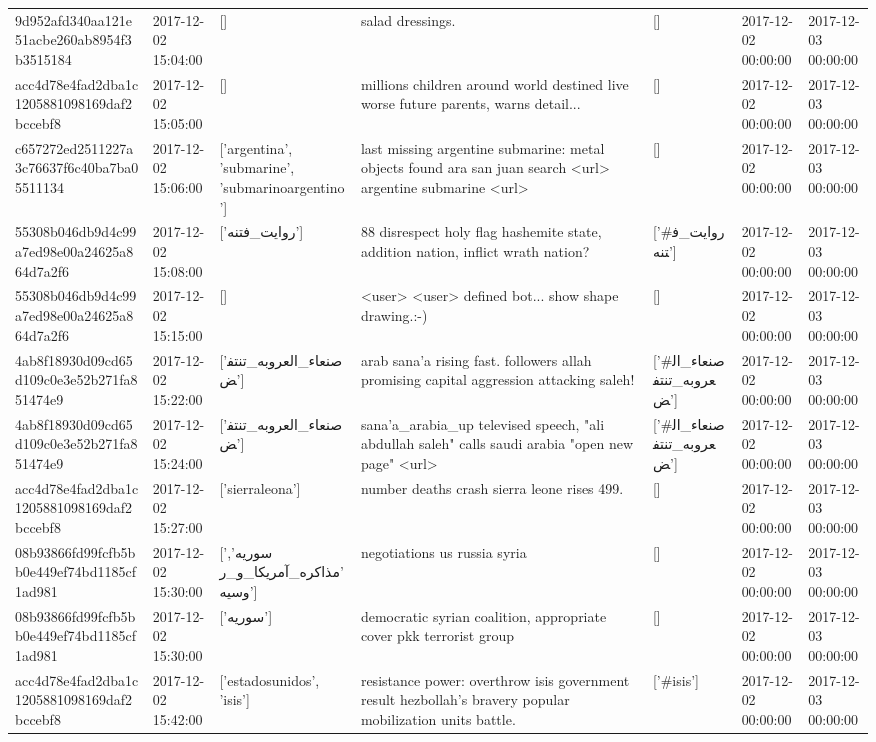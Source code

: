 \begin{tabular}{lllllll}
9d952afd340aa121e51acbe260ab8954f3b3515184 & 2017-12-02 15:04:00 & [] & salad dressings. & [] & 2017-12-02 00:00:00 & 2017-12-03 00:00:00 \\
acc4d78e4fad2dba1c1205881098169daf2bccebf8 & 2017-12-02 15:05:00 & [] & millions children around world destined live worse future parents, warns detail... & [] & 2017-12-02 00:00:00 & 2017-12-03 00:00:00 \\
c657272ed2511227a3c76637f6c40ba7ba05511134 & 2017-12-02 15:06:00 & ['argentina', 'submarine', 'submarinoargentino'] & last missing argentine submarine: metal objects found ara san juan search <url> argentine submarine <url> & [] & 2017-12-02 00:00:00 & 2017-12-03 00:00:00 \\
55308b046db9d4c99a7ed98e00a24625a864d7a2f6 & 2017-12-02 15:08:00 & ['روایت_فتنه'] & 88 disrespect holy flag hashemite state, addition nation, inflict wrath nation? & ['#روایت_فتنه'] & 2017-12-02 00:00:00 & 2017-12-03 00:00:00 \\
55308b046db9d4c99a7ed98e00a24625a864d7a2f6 & 2017-12-02 15:15:00 & [] & <user> <user> defined bot... show shape drawing.:-) & [] & 2017-12-02 00:00:00 & 2017-12-03 00:00:00 \\
4ab8f18930d09cd65d109c0e3e52b271fa851474e9 & 2017-12-02 15:22:00 & ['صنعاء_العروبه_تنتفض'] & arab sana'a rising fast. followers allah promising capital aggression attacking saleh! & ['#صنعاء_العروبه_تنتفض'] & 2017-12-02 00:00:00 & 2017-12-03 00:00:00 \\
4ab8f18930d09cd65d109c0e3e52b271fa851474e9 & 2017-12-02 15:24:00 & ['صنعاء_العروبه_تنتفض'] & sana'a\_arabia\_up televised speech, "ali abdullah saleh" calls saudi arabia "open new page" <url> & ['#صنعاء_العروبه_تنتفض'] & 2017-12-02 00:00:00 & 2017-12-03 00:00:00 \\
acc4d78e4fad2dba1c1205881098169daf2bccebf8 & 2017-12-02 15:27:00 & ['sierraleona'] & number deaths crash sierra leone rises 499. & [] & 2017-12-02 00:00:00 & 2017-12-03 00:00:00 \\
08b93866fd99fcfb5bb0e449ef74bd1185cf1ad981 & 2017-12-02 15:30:00 & ['سوریه', 'مذاکره_آمریکا_و_روسیه'] & negotiations us russia syria & [] & 2017-12-02 00:00:00 & 2017-12-03 00:00:00 \\
08b93866fd99fcfb5bb0e449ef74bd1185cf1ad981 & 2017-12-02 15:30:00 & ['سوریه'] & democratic syrian coalition, appropriate cover pkk terrorist group & [] & 2017-12-02 00:00:00 & 2017-12-03 00:00:00 \\
acc4d78e4fad2dba1c1205881098169daf2bccebf8 & 2017-12-02 15:42:00 & ['estadosunidos', 'isis'] & resistance power: overthrow isis government result hezbollah's bravery popular mobilization units battle. & ['#isis'] & 2017-12-02 00:00:00 & 2017-12-03 00:00:00 \\

\end{tabular}
